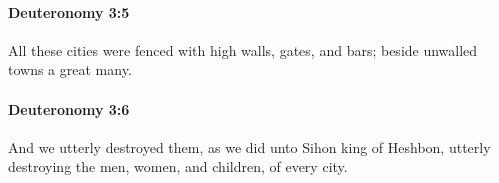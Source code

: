		\paragraph{Deuteronomy 3:5} %
			\label{DEUTERONOMY-3-5}

			All these cities were fenced with high walls, gates, and bars; beside unwalled towns a great many.


		\paragraph{Deuteronomy 3:6} %
			\label{DEUTERONOMY-3-6}

			And we utterly destroyed them, as we did unto Sihon king of Heshbon, utterly destroying the men, women, and children, of every city.


